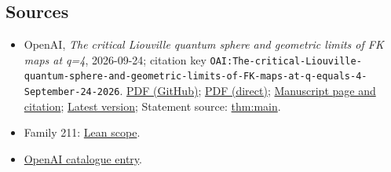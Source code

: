 \documentclass[11pt]{article}
\begin{document}
\subsection{Sources}
\begin{itemize}
\item OpenAI, \emph{The critical Liouville quantum sphere and geometric limits of FK maps at q=4}, 2026-09-24; citation key \texttt{OAI:The-critical-Liouville-quantum-sphere-and-geometric-limits-of-FK-maps-at-q-equals-4-September-24-2026}. \href{https://github.com/openai/math/blob/adc7f1241b42e322a6451854ab7e4b4c146bf78a/preprints/The-critical-Liouville-quantum-sphere-and-geometric-limits-of-FK-maps-at-q-equals-4-September-24-2026/main.pdf}{PDF (GitHub)}; \href{https://github.com/openai/math/raw/adc7f1241b42e322a6451854ab7e4b4c146bf78a/preprints/The-critical-Liouville-quantum-sphere-and-geometric-limits-of-FK-maps-at-q-equals-4-September-24-2026/main.pdf}{PDF (direct)}; \href{https://github.com/openai/math/blob/adc7f1241b42e322a6451854ab7e4b4c146bf78a/preprints/The-critical-Liouville-quantum-sphere-and-geometric-limits-of-FK-maps-at-q-equals-4-September-24-2026/README.md}{Manuscript page and citation}; \href{https://github.com/openai/math/blob/main/preprints/The-critical-Liouville-quantum-sphere-and-geometric-limits-of-FK-maps-at-q-equals-4-September-24-2026/main.pdf}{Latest version}; Statement source: \href{https://github.com/openai/math/blob/adc7f1241b42e322a6451854ab7e4b4c146bf78a/preprints/The-critical-Liouville-quantum-sphere-and-geometric-limits-of-FK-maps-at-q-equals-4-September-24-2026/build/sections/00-introduction.tex\#L189}{thm:main}.
\item Family 211: \href{https://github.com/openai/math/blob/adc7f1241b42e322a6451854ab7e4b4c146bf78a/lean/docs/211.md}{Lean scope}.
\item \href{https://github.com/openai/math/blob/adc7f1241b42e322a6451854ab7e4b4c146bf78a/CONTENTS.md}{OpenAI catalogue entry}.
\end{itemize}
\end{document}
